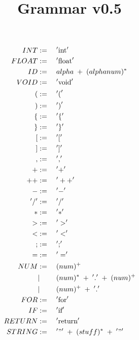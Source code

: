 \documentclass{article}
\title{Grammar v0.5}
\begin{document}
\maketitle
\begin{alignat*}{3}
INT &:=\;&&'\textrm{int}'\\
FLOAT &:=&&'\textrm{float}'\\
ID &:=&&alpha\;+\;(alphanum)^*\\
VOID &:=&&'\textrm{void}'\\
( &:=&& '\textrm{(}'\\
) &:=&& '\textrm{)}'\\
\{ &:=&& '\{'\\
\} &:=&& '\}'\\
[ &:=&& '['\\
] &:=&& ']'\\
, &:=&& ','\\
+ &:=&& '+'\\
++ &:=&& '++'\\
- &:=&& '-'\\
'/' &:=&& '/'\\
* &:=&& '*'\\
> &:=&& '>'\\
< &:=&& '<'\\
; &:=&& ';'\\
= &:=&& '='\\
NUM &:=&& (num)^+\\
&\vert&& (num)^*\;+\;'.'\;+\;(num)^+\\
&\vert&& (num)^+\;+\;'.'\\
FOR &:=&& '\textrm{for}'\\
IF &:=&& '\textrm{if}'\\
RETURN &:=&& '\textrm{return}'\\
STRING &:=&& '"'\;+\;(stuff)^*\;+\;'"'
\end{alignat*}
\end{document}
